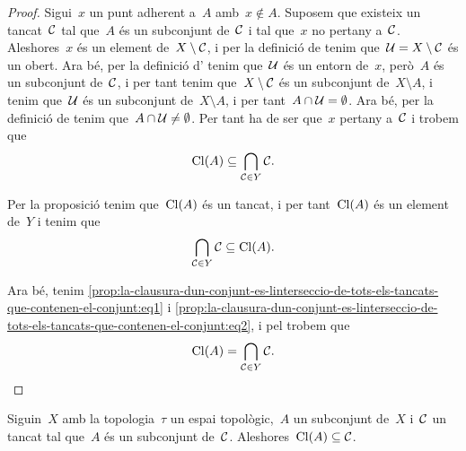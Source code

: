 \documentclass[../../main.tex]{subfiles}
\begin{document}
    \begin{proof}
        Sigui~\(x\) un punt adherent a~\(A\) amb~\(x\notin A\).
        Suposem que existeix un tancat~\(\mathcal{C}\) tal que~\(A\) és un subconjunt de~\(\mathcal{C}\) i tal que~\(x\) no pertany a~\(\mathcal{C}\).
        Aleshores~\(x\) és un element de~\(X\setminus\mathcal{C}\), i per la definició de  tenim que~\(\mathcal{U}=X\setminus\mathcal{C}\) és un obert.
        Ara bé, per la definició d' tenim que~\(\mathcal{U}\) és un entorn de~\(x\), però~\(A\) és un subconjunt de~\(\mathcal{C}\), i per tant tenim que~\(X\setminus\mathcal{C}\) és un subconjunt de~\(X\setminus A\), i tenim que~\(\mathcal{U}\) és un subconjunt de~\(X\setminus A\), i per tant~\(A\cap\mathcal{U}=\emptyset\).
        Ara bé, per la definició de  tenim que~\(A\cap\mathcal{U}\neq\emptyset\).
        Per tant ha de ser que~\(x\) pertany a~\(\mathcal{C}\) i trobem que
        \begin{equation}
            \label{prop:la-clausura-dun-conjunt-es-linterseccio-de-tots-els-tancats-que-contenen-el-conjunt:eq1}
            \operatorname{Cl}(A)\subseteq\bigcap_{\mathcal{C}\in Y}\mathcal{C}.
        \end{equation}

        Per la proposició  tenim que~\(\operatorname{Cl}(A)\) és un tancat, i per tant~\(\operatorname{Cl}(A)\) és un element de~\(Y\) i tenim que
        \begin{equation}
            \label{prop:la-clausura-dun-conjunt-es-linterseccio-de-tots-els-tancats-que-contenen-el-conjunt:eq2}
            \bigcap_{\mathcal{C}\in Y}\mathcal{C}\subseteq\operatorname{Cl}(A).
        \end{equation}

        Ara bé, tenim \eqref{prop:la-clausura-dun-conjunt-es-linterseccio-de-tots-els-tancats-que-contenen-el-conjunt:eq1} i \eqref{prop:la-clausura-dun-conjunt-es-linterseccio-de-tots-els-tancats-que-contenen-el-conjunt:eq2}, i pel  trobem que
        \[
            \operatorname{Cl}(A)=\bigcap_{\mathcal{C}\in Y}\mathcal{C}.\qedhere
        \]
    \end{proof}
    \begin{corollary}
        \label{cor:la-clausura-dun-conjunt-es-el-tancat-mes-petit-que-el-conte}
        Siguin~\(X\) amb la topologia~\(\tau\) un espai topològic,~\(A\) un subconjunt de~\(X\) i~\(\mathcal{C}\) un tancat tal que~\(A\) és un subconjunt de~\(\mathcal{C}\).
        Aleshores~\(\operatorname{Cl}(A)\subseteq\mathcal{C}\).
    \end{corollary}
\end{document}
